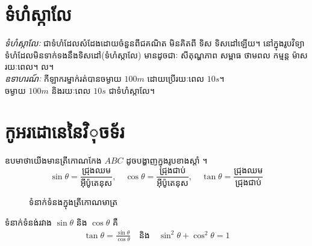 \section{ទំហំស្កាលែ}
\begin{definition}
	\emph{\kml ទំហំស្កាលែៈ} ជាទំហំដែលសំដែងដោយចំនួនពីជគណិត មិនគិតពី ទិស ទិសដៅឡើយ។ នៅក្នុងរូបវិទ្យាទំហំដែលមិនទាក់ទងនឹងទិសដៅ(ទំហំស្កាលែ) មានដូចជាៈ សីតុណ្ហភាព សម្ពាធ ថាមពល កម្មន្ត ម៉ាស រយៈពេល។ ល។\\
	\emph{\kml ឧទាហរណ៍ៈ} កីឡាករម្នាក់រត់បានចម្ងាយ $100m$ ដោយប្រើរយៈពេល $10s$។\\ ចម្ងាយ $100m$ និងរយៈពេល $10s$ ជាទំហំស្កាលែ។
\end{definition}
\section{កូអរដោនេនៃវិុចទ័រ}
	\begin{multicols}{2}
		ឧបមាថាយើងមានត្រីកោណកែង $ABC$ ដូចបង្ហាញក្នុងរូបខាងស្តាំ ។
		\begin{equation*}
			\sin\theta=\frac{\text{ជ្រុងឈម}}{\text{អុីប៉ូតេនុស}},\quad \cos\theta=\frac{\text{ជ្រុងជាប់}}{\text{អុីប៉ូតេនុស}},\quad \tan\theta=\frac{\text{ជ្រុងឈម}}{\text{ជ្រុងជាប់}}
		\end{equation*}
		\begin{figure}[H]
			\centering
			\caption{\koc ទំនាក់ទំនងក្នុងត្រីកោណមាត្រ}
		\end{figure}
	\end{multicols}
	ទំនាក់ទំនង់រវាង $\sin\theta$ និង $\cos\theta$ គឺ
	\begin{align*}
		\tan\theta=\frac{\sin\theta}{\cos\theta} \quad \text{និង}\quad \sin^{2}\theta+\cos^{2}\theta=1
	\end{align*}
